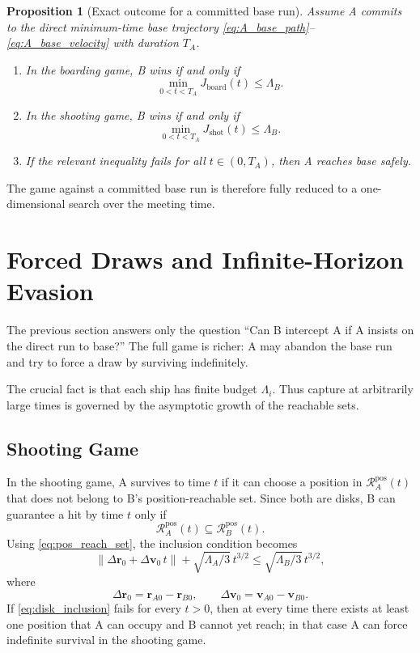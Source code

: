 \documentclass[journal, a4paper]{IEEEtran}
\newtheorem{proposition}{Proposition}
\begin{document}
\begin{proposition}[Exact outcome for a committed base run]
Assume A commits to the direct minimum-time base trajectory \eqref{eq:A_base_path}--\eqref{eq:A_base_velocity} with duration $T_A$.
\begin{enumerate}
\item In the boarding game, B wins if and only if
\begin{equation}
\min_{0<t<T_A} J_{\mathrm{board}}(t) \le \Lambda_B.
\end{equation}
\item In the shooting game, B wins if and only if
\begin{equation}
\min_{0<t<T_A} J_{\mathrm{shot}}(t) \le \Lambda_B.
\end{equation}
\item If the relevant inequality fails for all $t\in(0,T_A)$, then A reaches base safely.
\end{enumerate}
\end{proposition}

The game against a committed base run is therefore fully reduced to a one-dimensional search over the meeting time.

\section{Forced Draws and Infinite-Horizon Evasion}
The previous section answers only the question ``Can B intercept A if A insists on the direct run to base?'' The full game is richer: A may abandon the base run and try to force a draw by surviving indefinitely.

The crucial fact is that each ship has finite budget $\Lambda_i$. Thus capture at arbitrarily large times is governed by the asymptotic growth of the reachable sets.

\subsection{Shooting Game}
In the shooting game, A survives to time $t$ if it can choose a position in $\mathcal R_A^{\mathrm{pos}}(t)$ that does not belong to B's position-reachable set. Since both are disks, B can guarantee a hit by time $t$ only if
\begin{equation}
\mathcal R_A^{\mathrm{pos}}(t) \subseteq \mathcal R_B^{\mathrm{pos}}(t).
\end{equation}
Using \eqref{eq:pos_reach_set}, the inclusion condition becomes
\begin{equation}
\|\Delta \mathbf r_0 + \Delta \mathbf v_0\,t\|
+\sqrt{\Lambda_A/3}\,t^{3/2}
\le
\sqrt{\Lambda_B/3}\,t^{3/2},
\label{eq:disk_inclusion}
\end{equation}
where
\begin{equation}
\Delta \mathbf r_0 = \mathbf r_{A0}-\mathbf r_{B0},
\qquad
\Delta \mathbf v_0 = \mathbf v_{A0}-\mathbf v_{B0}.
\end{equation}
If \eqref{eq:disk_inclusion} fails for every $t>0$, then at every time there exists at least one position that A can occupy and B cannot yet reach; in that case A can force indefinite survival in the shooting game.
\end{document}
